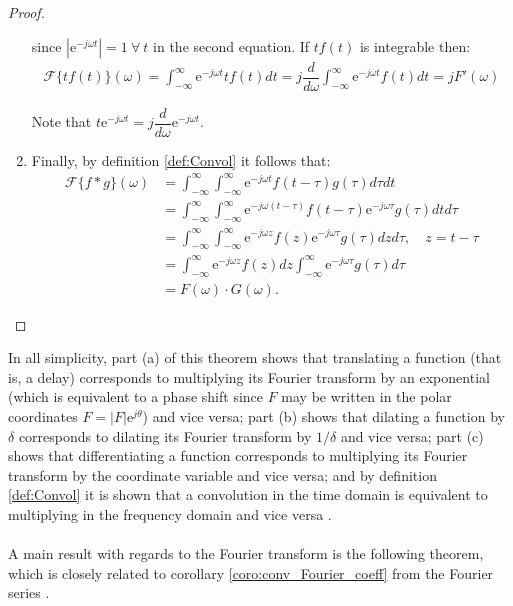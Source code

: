 \begin{proof}
\begin{enumerate}[label=(\alph*)]
since $|\text{e}^{-j\omega t}| = 1 \ \forall \ t$ in the second equation. If $tf(t)$ is integrable then:
\begin{align*}
\mathcal{F}\{tf(t)\}(\omega) = \int_{-\infty}^\infty \text{e}^{-j \omega t} t f(t) dt = j \dfrac{d}{d\omega} \int_{-\infty}^\infty \text{e}^{-j \omega t} f(t) dt = j F'(\omega)
\end{align*}

Note that $t \text{e}^{-j \omega t} = j \dfrac{d}{d\omega} \text{e}^{-j\omega t}$.

\item Finally, by definition \ref{def:Convol} it follows that:
\begin{align*}
\mathcal{F}\{f*g\}(\omega) &= \int_{-\infty}^\infty \int_{-\infty}^\infty \text{e}^{-j \omega t} f(t - \tau) g(\tau) d\tau dt \\
&= \int_{-\infty}^\infty \int_{-\infty}^\infty \text{e}^{-j\omega(t-\tau)} f(t-\tau) \text{e}^{-j\omega \tau} g(\tau) dt d\tau \\
&= \int_{-\infty}^\infty \int_{-\infty}^\infty \text{e}^{-j\omega z} f(z) \text{e}^{-j\omega \tau} g(\tau) dz d\tau, \quad z = t - \tau \\
&= \int_{-\infty}^\infty \text{e}^{-j\omega z} f(z) dz \int_{-\infty}^\infty \text{e}^{-j\omega \tau} g(\tau) d\tau \\
&= F(\omega) \cdot G(\omega).
\end{align*}
\end{enumerate}
\end{proof}

\noindent
In all simplicity, part (a) of this theorem shows that translating a function (that is, a delay) corresponds to multiplying its Fourier transform by an exponential (which is equivalent to a phase shift since $F$ may be written in the polar coordinates $F = |F|\text{e}^{j\theta}$) and vice versa; part (b) shows that dilating a function by $\delta$ corresponds to dilating its Fourier transform by $1/\delta$ and vice versa; part (c) shows that differentiating a function corresponds to multiplying its Fourier transform by the coordinate variable and vice versa; and by definition \ref{def:Convol} it is shown that a convolution in the time domain is equivalent to multiplying in the frequency domain and vice versa \cite{page 215, FAA}.
\\ \\
A main result with regards to the Fourier transform is the following theorem, which is closely related to corollary \ref{coro:conv_Fourier_coeff} from the Fourier series \cite{page 217, FAA}.

